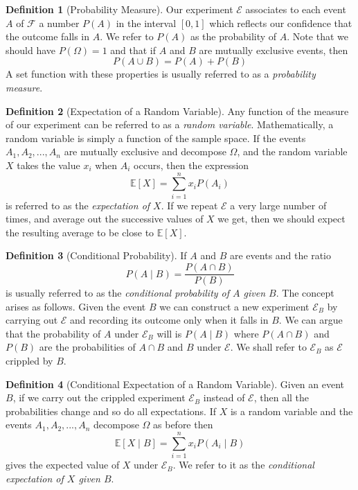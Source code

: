 \documentclass[11pt]{article}
\theoremstyle{definition}\newtheorem{definition}{Definition}
\theoremstyle{definition}\newtheorem{question}{Question}
\theoremstyle{definition}\newtheorem*{solution}{Solution}
\theoremstyle{definition}\newtheorem{example}{Example}
\theoremstyle{definition}\newtheorem{notation}{Notation}
\theoremstyle{theorem}\newtheorem{theorem}{Theorem}
\theoremstyle{theorem}\newtheorem{corollary}{Corollary}
\theoremstyle{theorem}\newtheorem{lemma}{Lemma}
\theoremstyle{theorem}\newtheorem{proposition}{Proposition}
\newcommand{\E}{\mathcal{E}}
\newcommand{\EE}{\mathbb{E}}
\newcommand{\FF}{\mathcal{F}}
\begin{document}
\begin{definition}[Probability Measure]
    Our experiment $\E$ associates to each event $A$ of $\FF$ a number $P(A)$ in the interval $[0, 1]$ which reflects our confidence that the outcome falls in $A$. We refer to $P(A)$ as the probability of $A$. Note that we should have $P(\Omega) = 1$ and that if $A$ and $B$ are mutually exclusive events, then
    \begin{equation*}
        P(A \cup B) = P(A) + P(B)
    \end{equation*}
    A set function with these properties is usually referred to as a \emph{probability measure}.
\end{definition}

\begin{definition}[Expectation of a Random Variable]
    Any function of the measure of our experiment can be referred to as a \emph{random variable}. Mathematically, a random variable is simply a function of the sample space. If the events $A_1, A_2,..., A_n$ are mutually exclusive and decompose $\Omega$, and the random variable $X$ takes the value $x_i$ when $A_i$ occurs, then the expression
    \begin{equation*}
        \EE[X] = \sum_{i = 1}^{n} x_i P(A_i)
    \end{equation*}
    is referred to as the \emph{expectation of $X$}. If we repeat $\E$ a very large number of times, and average out the successive values of $X$ we get, then we should expect the resulting average to be close to $\EE[X]$.
\end{definition}

\begin{definition}[Conditional Probability]
    If $A$ and $B$ are events and the ratio
    \begin{equation*}
        P(A \mid B) = \frac{P(A \cap B)}{P(B)}
    \end{equation*}
    is usually referred to as the \emph{conditional probability of $A$ given $B$}. The concept arises as follows. Given the event $B$ we can construct a new experiment $\E_B$ by carrying out $\E$ and recording its outcome only when it falls in $B$. We can argue that the probability of $A$ under $\E_B$ will is $P(A \mid B)$ where $P(A \cap B)$ and $P(B)$ are the probabilities of $A \cap B$ and $B$ under $\E$. We shall refer to $\E_B$ as $\E$ crippled by $B$.
\end{definition}

\begin{definition}[Conditional Expectation of a Random Variable]
    Given an event $B$, if we carry out the crippled experiment $\E_B$ instead of $\E$, then all the probabilities change and so do all expectations. If $X$ is a random variable and the events $A_1, A_2,..., A_n$ decompose $\Omega$ as before then
    \begin{equation*}
        \EE[X \mid B] = \sum_{i = 1}^{n} x_i P(A_i \mid B)
    \end{equation*}
    gives the expected value of $X$ under $\E_B$. We refer to it as the \emph{conditional expectation of $X$ given $B$}.
\end{definition}
\end{document}
